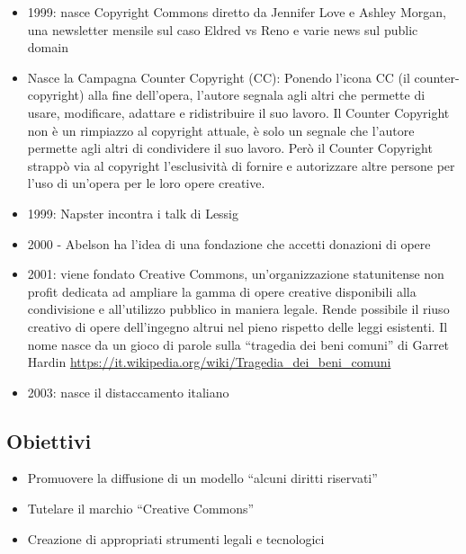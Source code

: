\begin{itemize}
\item 1999: nasce Copyright Commons diretto da Jennifer Love e Ashley Morgan, una newsletter mensile sul caso Eldred vs Reno e varie news sul public domain

\item Nasce la Campagna Counter Copyright (CC): Ponendo l'icona CC (il counter-copyright) alla fine dell'opera, l'autore segnala agli altri che permette di usare, modificare, adattare e ridistribuire il suo lavoro. Il Counter Copyright non è un rimpiazzo al copyright attuale, è solo un segnale che l'autore permette agli altri di condividere il suo lavoro. 
Però il Counter Copyright strappò via al copyright l'esclusività di fornire e autorizzare altre persone per l'uso di un'opera per le loro opere creative.

\item 1999: Napster incontra i talk di Lessig

\item 2000 - Abelson ha l'idea di  una fondazione che accetti donazioni di opere

\item 2001: viene fondato Creative Commons, un'organizzazione statunitense non profit dedicata ad ampliare la gamma di opere creative disponibili alla condivisione e all'utilizzo pubblico in maniera legale. Rende possibile il riuso creativo di opere dell'ingegno altrui nel pieno rispetto delle leggi esistenti.
Il nome nasce da un gioco di parole sulla “tragedia dei beni comuni”
di Garret Hardin \url{https://it.wikipedia.org/wiki/Tragedia_dei_beni_comuni}

\item 2003: nasce il distaccamento italiano
\end{itemize}

\subsection{Obiettivi}
\begin{itemize}
\item Promuovere la diffusione di un modello “alcuni diritti riservati”

\item Tutelare il marchio “Creative Commons”

\item Creazione di appropriati strumenti legali e tecnologici
\end{itemize}

